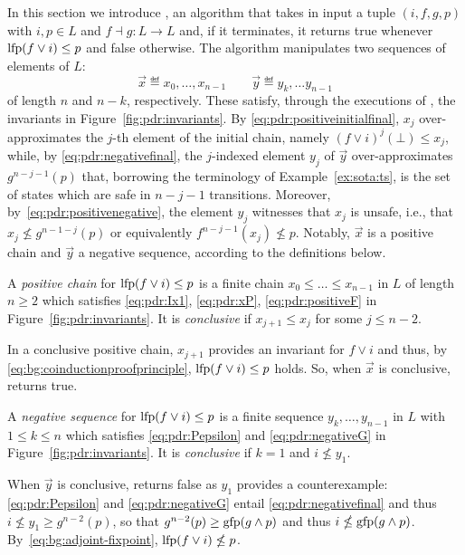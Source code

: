 In this section we introduce {\APDR}, an algorithm that takes in input a tuple $(i,f,g,p)$ with $i,p\in L$ and $f\dashv g \colon L\to L$ and, if it terminates, it returns true whenever $\text{lfp} (f \lor i) \le p$ and false otherwise. The algorithm manipulates two sequences of elements of $L$:
\[
\vec{x} \eqdef x_0, \dots, x_{n-1} \qquad \vec{y} \eqdef y_k, \dots y_{n-1}
\]
of length $n$ and $n-k$, respectively. These satisfy, through the executions of {\APDR}, the invariants in Figure~\ref{fig:pdr:invariants}. By \eqref{eq:pdr:positiveinitialfinal}, $x_j$ over-approximates the $j$-th element of the initial chain, namely $(f \lor i)^j(\bot) \le x_j$, while, by \eqref{eq:pdr:negativefinal}, the $j$-indexed element $y_j$ of $\vec{y}$ over-approximates $g^{n-j-1}(p)$ that, borrowing the terminology of Example~\ref{ex:sota:ts}, is the set of states which are safe in $n-j-1$ transitions.
Moreover, by~\eqref{eq:pdr:positivenegative}, the element $y_j$ witnesses that $x_j$ is unsafe, i.e., that $x_j \nleq g^{n-1-j}(p)$ or equivalently $f^{n-j-1}(x_j) \nleq p$.
Notably, $\vec{x}$ is a positive chain and $\vec{y}$ a negative sequence, according to the definitions below.

\begin{definition} \label{def:pdr:posi_seq}
	A \emph{positive chain} for $\text{lfp} (f \lor i) \le p$ is a finite chain $x_0 \le \dots \le x_{n-1}$ in $L$ of length $n \geq 2$ which satisfies \eqref{eq:pdr:Ix1}, \eqref{eq:pdr:xP}, \eqref{eq:pdr:positiveF} in Figure~\ref{fig:pdr:invariants}.
	It is \emph{conclusive} if $x_{j+1} \le x_j$ for some $j \leq n-2$.
\end{definition}

In a conclusive positive chain, $x_{j+1}$ provides an invariant for $f \lor i$ and thus, by \eqref{eq:bg:coinductionproofprinciple}, $\text{lfp} (f \lor i) \le p$ holds. So, when $\vec{x}$ is conclusive, {\APDR} returns true.

\begin{definition} \label{def:pdr:neg_seq}
	A \emph{negative sequence} for $\text{lfp} (f \lor i) \le p$ is a finite sequence $ y_k, \dots, y_{n-1}$ in $L$ with $1 \leq k \leq n$ which satisfies \eqref{eq:pdr:Pepsilon} and \eqref{eq:pdr:negativeG} in Figure~\ref{fig:pdr:invariants}.
	It is \emph{conclusive} if $k=1$ and $i \nleq y_1$.
\end{definition}

When $\vec{y}$ is conclusive, {\APDR} returns false as $y_1$ provides a counterexample: \eqref{eq:pdr:Pepsilon} and \eqref{eq:pdr:negativeG} entail \eqref{eq:pdr:negativefinal} and thus $i \nleq y_1 \ge g^{n-2}(p)$, so that $g^{n-2}(p) \ge \text{gfp} (g \land p)$ and thus $i \nleq \text{gfp}(g \land p)$. By~\eqref{eq:bg:adjoint-fixpoint}, $\text{lfp}(f \lor i) \nleq p$.

